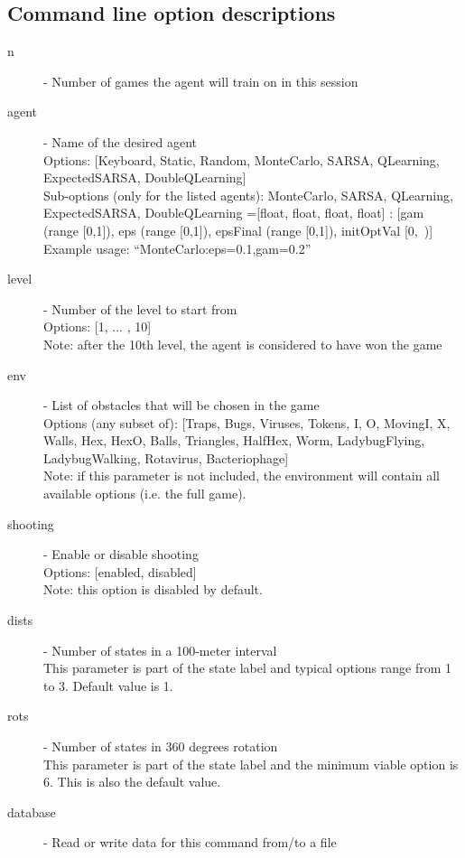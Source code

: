\subsection{Command line option descriptions}
\begin{description}
\item[n] - Number of games the agent will train on in this session \label{opt:n}
\item[agent] - Name of the desired agent \label{opt:agent}\\
Options: [Keyboard, Static, Random, MonteCarlo, SARSA, QLearning, ExpectedSARSA, DoubleQLearning]\\
Sub-options (only for the listed agents):
MonteCarlo, SARSA, QLearning, ExpectedSARSA, DoubleQLearning
=[float, float, float, float] :
[gam (range [0,1]), eps (range [0,1]), epsFinal (range [0,1]), initOptVal [0,~)]\\
Example usage: ``MonteCarlo:eps=0.1,gam=0.2''
\item[level] - Number of the level to start from \label{opt:level}\\
Options: [1, ... , 10]\\
Note: after the 10th level, the agent is considered to have won the game
\item[env] - List of obstacles that will be chosen in the game \label{opt:env}\\
Options (any subset of): [Traps, Bugs, Viruses, Tokens,
I, O, MovingI, X, Walls, Hex,
HexO, Balls, Triangles, HalfHex,
Worm, LadybugFlying, LadybugWalking,
Rotavirus, Bacteriophage]\\
Note: if this parameter is not included, the environment will contain all available options (i.e. the full game).
\item[shooting] - Enable or disable shooting \label{opt:shooting}\\
Options: [enabled, disabled]\\
Note: this option is disabled by default.
\item[dists] - Number of states in a 100-meter interval \label{opt:dists}\\
This parameter is part of the state label and typical options range from 1 to 3. Default value is 1.
\item[rots] - Number of states in 360 degrees rotation \label{opt:rots}\\
This parameter is part of the state label and the minimum viable option is 6. This is also the default value.
\item[database] - Read or write data for this command from/to a file \label{opt:database}\\

\end{description}

